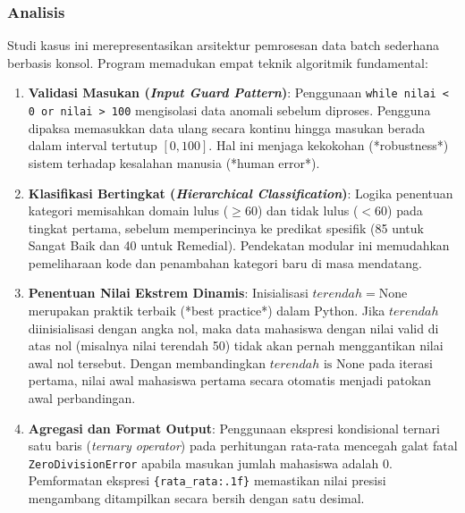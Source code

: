 \documentclass[12pt,a4paper]{article}
\begin{document}
\subsubsection{Analisis}
Studi kasus ini merepresentasikan arsitektur pemrosesan data batch sederhana berbasis konsol. Program memadukan empat teknik algoritmik fundamental:
\begin{enumerate}
    \item \textbf{Validasi Masukan (\textit{Input Guard Pattern})}: Penggunaan \texttt{while nilai < 0 or nilai > 100} mengisolasi data anomali sebelum diproses. Pengguna dipaksa memasukkan data ulang secara kontinu hingga masukan berada dalam interval tertutup $[0, 100]$. Hal ini menjaga kekokohan (*robustness*) sistem terhadap kesalahan manusia (*human error*).
    \item \textbf{Klasifikasi Bertingkat (\textit{Hierarchical Classification})}: Logika penentuan kategori memisahkan domain lulus ($\ge 60$) dan tidak lulus ($< 60$) pada tingkat pertama, sebelum memperincinya ke predikat spesifik (85 untuk Sangat Baik dan 40 untuk Remedial). Pendekatan modular ini memudahkan pemeliharaan kode dan penambahan kategori baru di masa mendatang.
    \item \textbf{Penentuan Nilai Ekstrem Dinamis}: Inisialisasi $terendah = \text{None}$ merupakan praktik terbaik (*best practice*) dalam Python. Jika $terendah$ diinisialisasi dengan angka nol, maka data mahasiswa dengan nilai valid di atas nol (misalnya nilai terendah 50) tidak akan pernah menggantikan nilai awal nol tersebut. Dengan membandingkan $terendah \text{ is None}$ pada iterasi pertama, nilai awal mahasiswa pertama secara otomatis menjadi patokan awal perbandingan.
    \item \textbf{Agregasi dan Format Output}: Penggunaan ekspresi kondisional ternari satu baris (\textit{ternary operator}) pada perhitungan rata-rata mencegah galat fatal \texttt{ZeroDivisionError} apabila masukan jumlah mahasiswa adalah 0. Pemformatan ekspresi \texttt{\{rata\_rata:.1f\}} memastikan nilai presisi mengambang ditampilkan secara bersih dengan satu desimal.
\end{enumerate}

\end{document}

